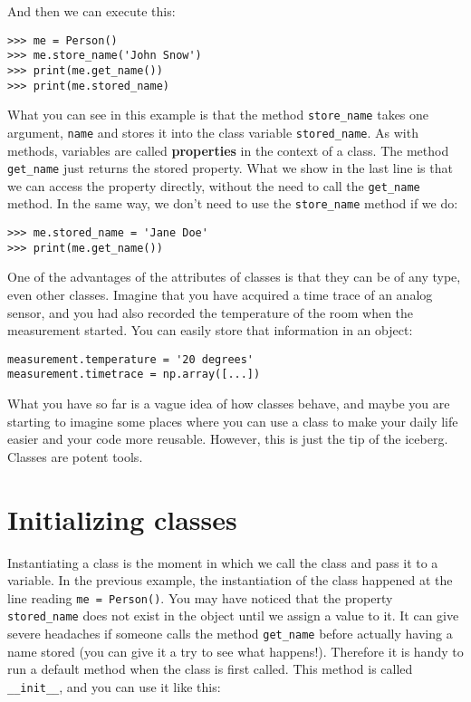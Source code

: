 And then we can execute this:

\begin{verbatim}
>>> me = Person()
>>> me.store_name('John Snow')
>>> print(me.get_name())
>>> print(me.stored_name)
\end{verbatim}

What you can see in this example is that the method \texttt{store_name} takes one argument, \texttt{name} and stores it into the class variable \texttt{stored_name}. As with methods, variables are called \textbf{properties} in the context of a class. The method \texttt{get_name} just returns the stored property. What we show in the last line is that we can access the property directly, without the need to call the \texttt{get_name} method. In the same way, we don't need to use the \texttt{store_name} method if we do:

\begin{verbatim}
>>> me.stored_name = 'Jane Doe'
>>> print(me.get_name())
\end{verbatim}

One of the advantages of the attributes of classes is that they can be of any type, even other classes. Imagine that you have acquired a time trace of an analog sensor, and you had also recorded the temperature of the room when the measurement started. You can easily store that information in an object:

\begin{verbatim}
measurement.temperature = '20 degrees'
measurement.timetrace = np.array([...])
\end{verbatim}

What you have so far is a vague idea of how classes behave, and maybe you are starting to imagine some places where you can use a class to make your daily life easier and your code more reusable. However, this is just the tip of the iceberg. Classes are potent tools.

\section{Initializing classes}\label{initializing-classes}
Instantiating a class is the moment in which we call the class and pass it to a variable. In the previous example, the instantiation of the class happened at the line reading \texttt{me = Person()}. You may have noticed that the property \texttt{stored_name} does not exist in the object until we assign a value to it. It can give severe headaches if someone calls the method \texttt{get_name} before actually having a name stored (you can give it a try to see what happens!). Therefore it is handy to run a default method when the class is first called. This method is called \texttt{__init__}, and you can use it like this:

